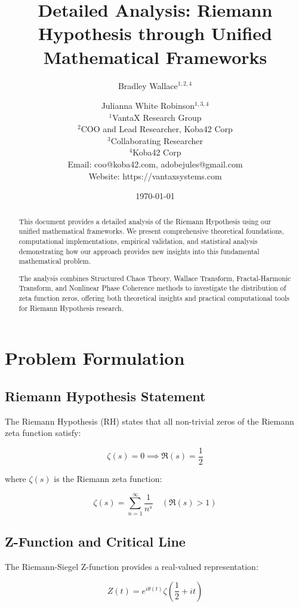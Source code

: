 \documentclass[12pt]{article}
\title{Detailed Analysis: Riemann Hypothesis through Unified Mathematical Frameworks}
\author{
Bradley Wallace$^{1,2,4}$ \and Julianna White Robinson$^{1,3,4}$ \\
$^1$VantaX Research Group \\
$^2$COO and Lead Researcher, Koba42 Corp \\
$^3$Collaborating Researcher \\
$^4$Koba42 Corp \\
Email: coo@koba42.com, adobejules@gmail.com \\
Website: https://vantaxsystems.com
}
\date{\today}
\begin{document}
\maketitle

\begin{abstract}
This document provides a detailed analysis of the Riemann Hypothesis using our unified mathematical frameworks. We present comprehensive theoretical foundations, computational implementations, empirical validation, and statistical analysis demonstrating how our approach provides new insights into this fundamental mathematical problem.

The analysis combines Structured Chaos Theory, Wallace Transform, Fractal-Harmonic Transform, and Nonlinear Phase Coherence methods to investigate the distribution of zeta function zeros, offering both theoretical insights and practical computational tools for Riemann Hypothesis research.
\end{abstract}

\section{Problem Formulation}

\subsection{Riemann Hypothesis Statement}

The Riemann Hypothesis (RH) states that all non-trivial zeros of the Riemann zeta function satisfy:

\begin{equation}
\zeta(s) = 0 \implies \Re(s) = \frac{1}{2}
\end{equation}

where $\zeta(s)$ is the Riemann zeta function:

\begin{equation}
\zeta(s) = \sum_{n=1}^{\infty} \frac{1}{n^s} \quad (\Re(s) > 1)
\end{equation}

\subsection{Z-Function and Critical Line}

The Riemann-Siegel Z-function provides a real-valued representation:

\begin{equation}
Z(t) = e^{i\theta(t)}\zeta\left(\frac{1}{2} + it\right)
\end{equation}
\end{document}
